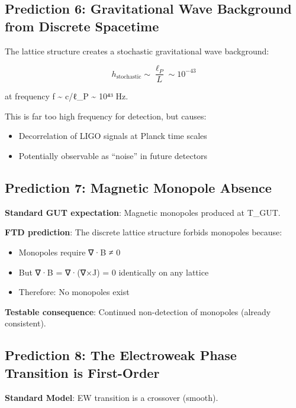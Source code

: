 \documentclass[
  11pt,
  letterpaper,
  twoside,
  openright]{book}
\providecommand{\tightlist}{%
  \setlength{\itemsep}{0pt}\setlength{\parskip}{0pt}}
\begin{document}
\subsection{Prediction 6: Gravitational Wave Background from Discrete
Spacetime}\label{prediction-6-gravitational-wave-background-from-discrete-spacetime}

The lattice structure creates a stochastic gravitational wave
background:

\[h_{\text{stochastic}} \sim \frac{\ell_P}{L} \sim 10^{-43}\]

at frequency f \textasciitilde{} c/ℓ\_P \textasciitilde{} 10⁴³ Hz.

This is far too high frequency for detection, but causes:

\begin{itemize}
\tightlist
\item
  Decorrelation of LIGO signals at Planck time scales
\item
  Potentially observable as ``noise'' in future detectors
\end{itemize}

\subsection{Prediction 7: Magnetic Monopole
Absence}\label{prediction-7-magnetic-monopole-absence}

\textbf{Standard GUT expectation}: Magnetic monopoles produced at
T\_GUT.

\textbf{FTD prediction}: The discrete lattice structure forbids
monopoles because:

\begin{itemize}
\tightlist
\item
  Monopoles require ∇·B ≠ 0
\item
  But ∇·B = ∇·(∇×J) = 0 identically on any lattice
\item
  Therefore: No monopoles exist
\end{itemize}

\textbf{Testable consequence}: Continued non-detection of monopoles
(already consistent).

\subsection{Prediction 8: The Electroweak Phase Transition is
First-Order}\label{prediction-8-the-electroweak-phase-transition-is-first-order}

\textbf{Standard Model}: EW transition is a crossover (smooth).
\end{document}
